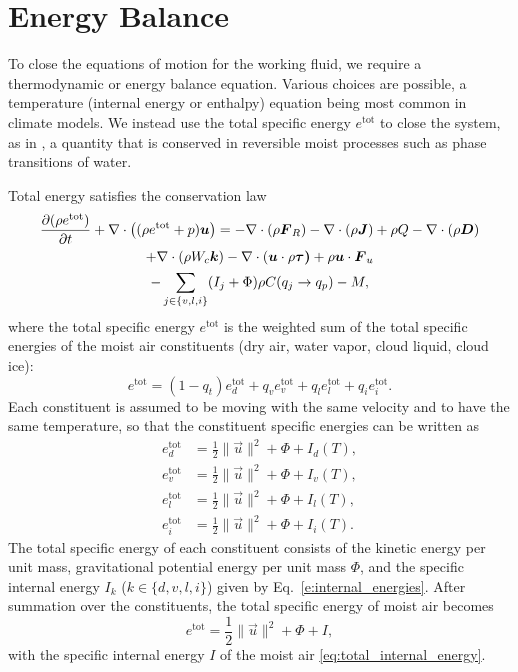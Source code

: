 \documentclass{report}
\begin{document}
\section{Energy Balance}\label{s:energy_balance}

To close the equations of motion for the working fluid, we require a thermodynamic or energy balance equation. Various choices are possible, a temperature (internal energy or enthalpy) equation being most common in climate models. We instead use the total specific energy $e^\mathrm{tot}$ to close the system, as in \citet{Romps08a}, a quantity that is conserved in reversible moist processes such as phase transitions of water. 

Total energy satisfies the conservation law \citep{Romps08a,Bott08a}
\begin{multline}
 \frac{\partial (\rho e^\mathrm{tot})}{\partial t} + \nabla \cdot \left( (\rho e^\mathrm{tot} + p)\boldsymbol{{u}} \right)
 = -\nabla \cdot (\rho \boldsymbol{{F}}_R) - \nabla \cdot (\rho \boldsymbol{{J}}) + \rho Q - \nabla \cdot (\rho \boldsymbol{{D}})  \\
  +\nabla \cdot \left(\rho W_c \boldsymbol{{k}} \right)  - \nabla \cdot (\boldsymbol{{u}} \cdot \rho\boldsymbol{{\tau)}} + \rho \boldsymbol{{u}} \cdot \boldsymbol{{F}}_u \\
   - \sum_{j\in\{v,l,i\}}(I_j + \Phi)  \rho C(q_j \rightarrow q_p) - M,
 \label{eq:energy_balance}
\end{multline}
where the total specific energy $e^{\mathrm{tot}}$ is the weighted sum of the total specific energies of the moist air constituents (dry air, water vapor, cloud liquid, cloud ice):
\begin{equation}\label{e:energy_sum}
    e^{\mathrm{tot}} = (1-q_t) e_d^{\mathrm{tot}} + q_v e_v^{\mathrm{tot}} + q_l e_l^{\mathrm{tot}} + q_i e_i^{\mathrm{tot}}.
\end{equation}
Each constituent is assumed to be moving with the same velocity and to have the same temperature, so that the constituent specific energies can be written as
\begin{subequations}\label{e:constituent_energies}
\begin{align}
e_d^{\mathrm{tot}} & = \frac{1}{2} \| \vec{u} \|^2 + \Phi + I_d(T), \\
e_v^{\mathrm{tot}} & = \frac{1}{2} \| \vec{u} \|^2 + \Phi + I_v(T), \\
e_l^{\mathrm{tot}} & = \frac{1}{2} \| \vec{u} \|^2 + \Phi + I_l(T), \\
e_i^{\mathrm{tot}} & = \frac{1}{2} \| \vec{u} \|^2 + \Phi + I_i(T).
\end{align}
\end{subequations}
The total specific energy of each constituent consists of the kinetic energy per unit mass, gravitational potential energy per unit mass $\Phi$, and the specific internal energy $I_k$ ($k \in \{d, v, l, i\}$) given by Eq.~\eqref{e:internal_energies}. After summation over the constituents, the total specific energy of moist air becomes
\begin{equation}
     e^{\mathrm{tot}} = \frac{1}{2} \| \vec{u} \|^2 + \Phi + I,
     \label{eq:total_energy_def}
\end{equation}
with the specific internal energy $I$ of the moist air \eqref{eq:total_internal_energy}.
\end{document}

